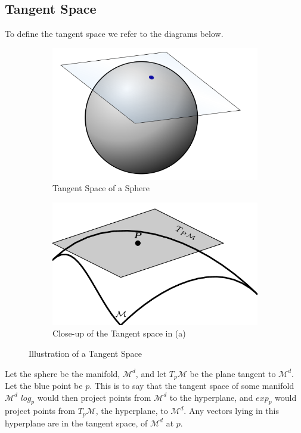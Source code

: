 \documentclass[12pt]{report}
\begin{document}
\subsection{Tangent Space}
To define the tangent space we refer to the diagrams below.\\
\begin{figure}[h]
\centering
\begin{subfigure}{.5\textwidth}
    \centering
    \includegraphics[scale=0.1]{tangent_space.png}
    \caption{Tangent Space of a Sphere}
    \label{tanspacesphere}
\end{subfigure}%
\begin{subfigure}{.5\textwidth}
    \centering
    \includegraphics[scale=0.35]{tangent_space2.png}
    \caption{Close-up of the Tangent space in (a)}
    \label{tanspacemanifold}
\end{subfigure}
\caption{Illustration of a Tangent Space}
\label{fig:test}
\end{figure}
Let the sphere be the manifold, $\mathcal{M}^d$, and let $T_p\mathcal{M}$ 
be the plane tangent to $\mathcal{M}^d$. Let the blue point be $p$.
This is to say that the tangent space of some manifold $\mathcal{M}^d$
$log_p$ would then project points from $\mathcal{M}^d$ to the hyperplane,
and $exp_p$ would project points from $T_p\mathcal{M}$, the hyperplane, to $\mathcal{M}^d$.
Any vectors lying in this hyperplane are in the tangent space,
of $\mathcal{M}^d$ at $p$.
\end{document}
